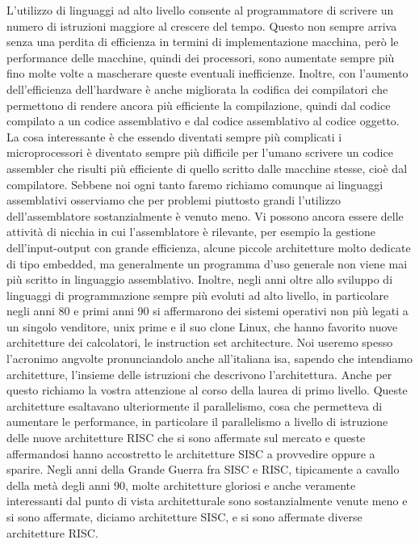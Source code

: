 L'utilizzo di linguaggi ad alto livello consente al programmatore di scrivere un numero di istruzioni maggiore al crescere del tempo.
Questo non sempre arriva senza una perdita di efficienza in termini di implementazione macchina, però le performance delle macchine, quindi dei processori, sono aumentate sempre più fino molte volte a mascherare queste eventuali inefficienze.
Inoltre, con l'aumento dell'efficienza dell'hardware è anche migliorata la codifica dei compilatori che permettono di rendere ancora più efficiente la compilazione, quindi dal codice compilato a un codice assemblativo e dal codice assemblativo al codice oggetto.
La cosa interessante è che essendo diventati sempre più complicati i microprocessori è diventato sempre più difficile per l'umano scrivere un codice assembler che risulti più efficiente di quello scritto dalle macchine stesse, cioè dal compilatore.
Sebbene noi ogni tanto faremo richiamo comunque ai linguaggi assemblativi osserviamo che per problemi piuttosto grandi l'utilizzo dell'assemblatore sostanzialmente è venuto meno.
Vi possono ancora essere delle attività di nicchia in cui l'assemblatore è rilevante, per esempio la gestione dell'input-output con grande efficienza, alcune piccole architetture molto dedicate di tipo embedded, ma generalmente un programma d'uso generale non viene mai più scritto in linguaggio assemblativo.
Inoltre, negli anni oltre allo sviluppo di linguaggi di programmazione sempre più evoluti ad alto livello, in particolare negli anni 80 e primi anni 90 si affermarono dei sistemi operativi non più legati a un singolo venditore, unix prime e il suo clone Linux, che hanno favorito nuove architetture dei calcolatori, le instruction set architecture.
Noi useremo spesso l'acronimo angvolte pronunciandolo anche all'italiana isa, sapendo che intendiamo architetture, l'insieme delle istruzioni che descrivono l'architettura.
Anche per questo richiamo la vostra attenzione al corso della laurea di primo livello.
Queste architetture esaltavano ulteriormente il parallelismo, cosa che permetteva di aumentare le performance, in particolare il parallelismo a livello di istruzione delle nuove architetture RISC che si sono affermate sul mercato e queste affermandosi hanno accostretto le architetture SISC a provvedire oppure a sparire.
Negli anni della Grande Guerra fra SISC e RISC, tipicamente a cavallo della metà degli anni 90, molte architetture gloriosi e anche veramente interessanti dal punto di vista architetturale sono sostanzialmente venute meno e si sono affermate, diciamo architetture SISC, e si sono affermate diverse architetture RISC.
